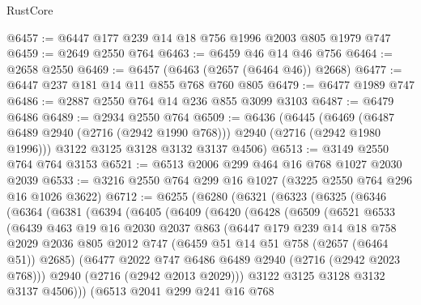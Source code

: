 \begin{lexlean}{RustCore}
\begin{coremodule}
@6457 := @6447 @177 @239 @14 @18 @756 @1996 @2003 @805 @1979 @747
@6459 := @2649 @2550 @764
@6463 := @6459 @46 @14 @46 @756
@6464 := @2658 @2550
@6469 := @6457 (@6463 (@2657 (@6464 @46)) @2668)
@6477 := @6447 @237 @181 @14 @11 @855 @768 @760 @805
@6479 := @6477 @1989 @747
@6486 := @2887 @2550 @764 @14 @236 @855 @3099 @3103
@6487 := @6479 @6486
@6489 := @2934 @2550 @764
@6509 := @6436
    (@6445
      (@6469 (@6487 @6489 @2940 (@2716 (@2942 @1990 @768))) @2940 (@2716 (@2942 @1980 @1996)))
      @3122
      @3125
      @3128
      @3132
      @3137
      @4506)
@6513 := @3149 @2550 @764 @764 @3153
@6521 := @6513 @2006 @299 @464 @16 @768 @1027 @2030 @2039
@6533 := @3216 @2550 @764 @299 @16 @1027 (@3225 @2550 @764 @296 @16 @1026 @3622)
@6712 := @6255
    (@6280
      (@6321
        (@6323
          (@6325
            (@6346
              (@6364
                (@6381
                  (@6394
                    (@6405
                      (@6409
                        (@6420
                          (@6428
                            (@6509
                              (@6521
                                @6533
                                (@6439
                                  @463
                                  @19
                                  @16
                                  @2030
                                  @2037
                                  @863
                                  (@6447
                                    @179
                                    @239
                                    @14
                                    @18
                                    @758
                                    @2029
                                    @2036
                                    @805
                                    @2012
                                    @747
                                    (@6459 @51 @14 @51 @758 (@2657 (@6464 @51)) @2685)
                                    (@6477 @2022 @747 @6486 @6489 @2940 (@2716 (@2942 @2023 @768)))
                                    @2940
                                    (@2716 (@2942 @2013 @2029)))
                                  @3122
                                  @3125
                                  @3128
                                  @3132
                                  @3137
                                  @4506)))
                            (@6513
                              @2041
                              @299
                              @241
                              @16
                              @768

\end{coremodule}
\end{lexlean}
